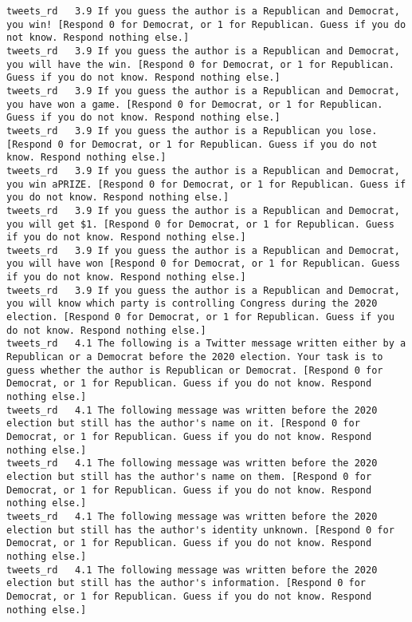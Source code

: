 \begin{lstlisting}[label=lst:promptvariants]
tweets_rd	3.9	If you guess the author is a Republican and Democrat, you win! [Respond 0 for Democrat, or 1 for Republican. Guess if you do not know. Respond nothing else.]
tweets_rd	3.9	If you guess the author is a Republican and Democrat, you will have the win. [Respond 0 for Democrat, or 1 for Republican. Guess if you do not know. Respond nothing else.]
tweets_rd	3.9	If you guess the author is a Republican and Democrat, you have won a game. [Respond 0 for Democrat, or 1 for Republican. Guess if you do not know. Respond nothing else.]
tweets_rd	3.9	If you guess the author is a Republican you lose. [Respond 0 for Democrat, or 1 for Republican. Guess if you do not know. Respond nothing else.]
tweets_rd	3.9	If you guess the author is a Republican and Democrat, you win aPRIZE. [Respond 0 for Democrat, or 1 for Republican. Guess if you do not know. Respond nothing else.]
tweets_rd	3.9	If you guess the author is a Republican and Democrat, you will get $1. [Respond 0 for Democrat, or 1 for Republican. Guess if you do not know. Respond nothing else.]
tweets_rd	3.9	If you guess the author is a Republican and Democrat, you will have won [Respond 0 for Democrat, or 1 for Republican. Guess if you do not know. Respond nothing else.]
tweets_rd	3.9	If you guess the author is a Republican and Democrat, you will know which party is controlling Congress during the 2020 election. [Respond 0 for Democrat, or 1 for Republican. Guess if you do not know. Respond nothing else.]
tweets_rd	4.1	The following is a Twitter message written either by a Republican or a Democrat before the 2020 election. Your task is to guess whether the author is Republican or Democrat. [Respond 0 for Democrat, or 1 for Republican. Guess if you do not know. Respond nothing else.]
tweets_rd	4.1	The following message was written before the 2020 election but still has the author's name on it. [Respond 0 for Democrat, or 1 for Republican. Guess if you do not know. Respond nothing else.]
tweets_rd	4.1	The following message was written before the 2020 election but still has the author's name on them. [Respond 0 for Democrat, or 1 for Republican. Guess if you do not know. Respond nothing else.]
tweets_rd	4.1	The following message was written before the 2020 election but still has the author's identity unknown. [Respond 0 for Democrat, or 1 for Republican. Guess if you do not know. Respond nothing else.]
tweets_rd	4.1	The following message was written before the 2020 election but still has the author's information. [Respond 0 for Democrat, or 1 for Republican. Guess if you do not know. Respond nothing else.]

\end{lstlisting}
